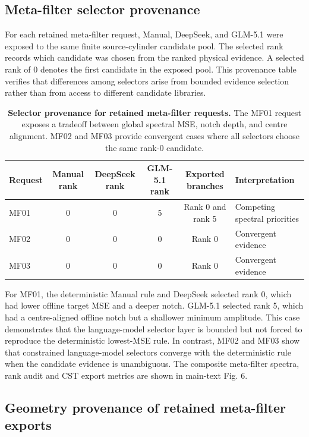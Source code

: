 \documentclass[final,1p,times]{elsarticle}
\begin{document}
\subsection{Meta-filter selector provenance}

For each retained meta-filter request, Manual, DeepSeek, and GLM-5.1 were exposed to the same finite source-cylinder candidate pool. The selected rank records which candidate was chosen from the ranked physical evidence. A selected rank of 0 denotes the first candidate in the exposed pool. This provenance table verifies that differences among selectors arise from bounded evidence selection rather than from access to different candidate libraries.

\begin{table}[htbp!]
\centering
\caption{\textbf{Selector provenance for retained meta-filter requests.}
The MF01 request exposes a tradeoff between global spectral MSE, notch depth, and centre alignment. MF02 and MF03 provide convergent cases where all selectors choose the same rank-0 candidate.}
\label{tab:si_phase6_metafilter_ranks}
\small
\setlength{\tabcolsep}{5pt}
\renewcommand{\arraystretch}{1.12}
\begin{tabular}{lccccl}
\toprule
Request & Manual rank & DeepSeek rank & GLM-5.1 rank & Exported branches & Interpretation \\
\midrule
MF01 & 0 & 0 & 5 & Rank 0 and rank 5 & Competing spectral priorities \\
MF02 & 0 & 0 & 0 & Rank 0 & Convergent evidence \\
MF03 & 0 & 0 & 0 & Rank 0 & Convergent evidence \\
\bottomrule
\end{tabular}
\end{table}

For MF01, the deterministic Manual rule and DeepSeek selected rank 0, which had lower offline target MSE and a deeper notch. GLM-5.1 selected rank 5, which had a centre-aligned offline notch but a shallower minimum amplitude. This case demonstrates that the language-model selector layer is bounded but not forced to reproduce the deterministic lowest-MSE rule. In contrast, MF02 and MF03 show that constrained language-model selectors converge with the deterministic rule when the candidate evidence is unambiguous. The composite meta-filter spectra, rank audit and CST export metrics are shown in main-text Fig. 6.

\subsection{Geometry provenance of retained meta-filter exports}
\end{document}
